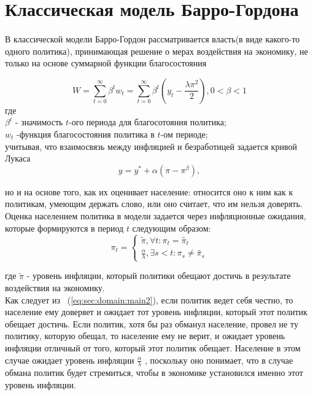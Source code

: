 \section{Классическая модель Барро-Гордона}
\label{sec:domain}

\paragraph{} В классической модели Барро-Гордон рассматривается власть(в виде какого-то одного политика), принимающая решение о мерах воздействия на экономику, не только на основе суммарной функции благосостояния

\begin{equation}
 \label{eq:sec:domain:main}
W=\sum_{t=0}^{\infty}\beta^t w_t = \sum_{t=0}^{\infty}\beta^t\left(y_t-\frac{\lambda\pi^2}{2}\right), 0<\beta<1
\end{equation}
где   \\   $\beta^t$ - значимость $t$-ого периода для благосотояния политика; 
\\ 
$w_t$
 -функция благосостояния политика в $t$-ом периоде;
\\ 
учитывая, что взаимосвязь между инфляцией и безработицей задается кривой Лукаса
\begin{equation}
	\label{eq:sec:domain:main1}
	y=y^*+\alpha(\pi-\pi^\beta),
\end{equation}

но и на основе того, как их оценивает население: относится оно к ним как к политикам, умеющим держать слово, или оно считает, что им нельзя доверять.
\\
Оценка населением политика в модели задается через инфляционные ожидания, которые формируются в период $t$ следующим образом:
\begin{equation}
\label{eq:sec:domain:main2}
\pi_t = \left\{ \begin{aligned} \tilde{\pi},\forall t:\pi_t=\tilde{\pi_t} 
\\ 
\frac{\alpha}{\lambda}, \exists s < t : \pi_s \ne \tilde{\pi_s} \end{aligned} \right. 
\end{equation}

где $\tilde{\pi}$ - уровень инфляции, который политики обещают достичь в результате воздействия на экономику.
\\

Как следует из ~(\ref{eq:sec:domain:main2}), если политик ведет себя честно, то население ему доверяет и ожидает тот уровень инфляции, который этот политик обещает достичь. Если политик, хотя бы раз обманул население, провел не ту политику, которую обещал, то население ему не верит, и ожидает уровень инфляции отличный от того, который этот политик обещает. Население в этом случае ожидает уровень инфляции $\frac{\alpha}{\lambda}$ , поскольку оно понимает, что в случае обмана политик будет стремиться, чтобы в экономике установился именно этот уровень инфляции.
\\


